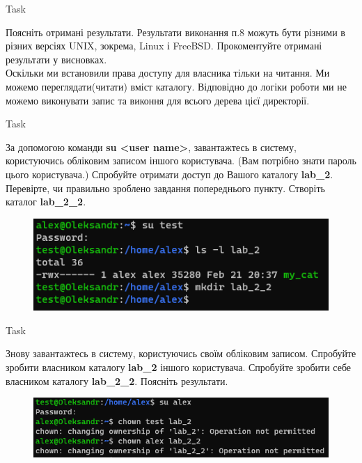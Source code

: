 \documentclass[a4paper,12pt]{article}
\newcommand{\RomanNumeralCaps}[1]{\MakeUppercase{\romannumeral #1}}
\begin{document}
    \begin{center}
        \Large{Task \RomanNumeralCaps{10}}
    \end{center}
    Поясніть отримані результати. Результати виконання п.8 можуть бути різними в різних версіях UNIX, зокрема, Linux і FreeBSD. Прокоментуйте отримані результати у
    висновках. \\
    Оскільки ми встановили права доступу для власника тільки на читання. Ми можемо переглядати(читати) вміст каталогу. 
    Відповідно до логіки роботи ми не можемо виконувати запис та виконня для всього дерева цієї директорії.
    
\newpage
    \begin{center}
        \Large{Task \RomanNumeralCaps{11}}
    \end{center}
    За допомогою команди \textbf{su <user name>}, завантажтесь в систему, користуючись обліковим записом іншого користувача. (Вам потрібно знати пароль цього
    користувача.) Спробуйте отримати доступ до Вашого каталогу \textbf{lab\_2}. Перевірте, чи правильно зроблено завдання попереднього пункту. Створіть каталог \textbf{lab\_2\_2}.
    \begin{figure}[h!]
        \begin{minipage}[h]{1\linewidth}
            \centering
            \includegraphics[width=0.6\linewidth]{Prt sc/Figure_11.png}  
        \end{minipage}
    \end{figure}

    \begin{center}
        \Large{Task \RomanNumeralCaps{12}}
    \end{center}
    Знову завантажтесь в систему, користуючись своїм обліковим записом. Спробуйте зробити власником каталогу \textbf{lab\_2} іншого користувача. Спробуйте зробити 
    себе власником каталогу \textbf{lab\_2\_2}. Поясніть результати.
    \begin{figure}[h!]
        \begin{minipage}[h]{1\linewidth}
            \centering
            \includegraphics[width=0.6\linewidth]{Prt sc/Figure_12.png}  
        \end{minipage}
    \end{figure} 
\end{document}
